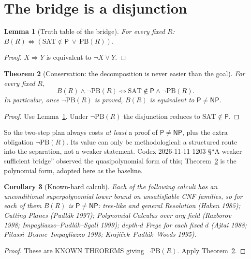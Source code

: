 \documentclass[11pt]{article}
\newtheorem{theorem}{Theorem}
\newtheorem{lemma}[theorem]{Lemma}
\newtheorem{corollary}[theorem]{Corollary}
\theoremstyle{definition}
\newcommand{\Pclass}{\mathsf{P}}
\newcommand{\NP}{\mathsf{NP}}
\newcommand{\SAT}{\mathrm{SAT}}
\newcommand{\PB}{\mathrm{PB}}
\begin{document}
\section{The bridge is a disjunction}
\begin{lemma}[Truth table of the bridge]\label{lem:truth}
For every fixed $R$: $B(R)\iff(\SAT\notin\Pclass\ \vee\ \PB(R))$.
\end{lemma}
\begin{proof}
$X\Rightarrow Y$ is equivalent to $\neg X\vee Y$.
\end{proof}

\begin{theorem}[Conservation: the decomposition is never easier than the goal]\label{thm:conservation}
For every fixed $R$,
\[
B(R)\wedge\neg\PB(R)\iff \SAT\notin\Pclass\wedge\neg\PB(R).
\]
In particular, once $\neg\PB(R)$ is proved, $B(R)$ is equivalent to
$\Pclass\neq\NP$.
\end{theorem}
\begin{proof}
Use Lemma~\ref{lem:truth}. Under $\neg\PB(R)$ the disjunction reduces to
$\SAT\notin\Pclass$.
\end{proof}

So the two-step plan always costs \emph{at least} a proof of
$\Pclass\neq\NP$, plus the extra obligation $\neg\PB(R)$. Its value can only be
methodological: a structured route into the separation, not a weaker statement.
Codex 2026-11-11 1203 §``A weaker sufficient bridge'' observed the
quasipolynomial form of this; Theorem~\ref{thm:conservation} is the polynomial
form, adopted here as the baseline.

\begin{corollary}[Known-hard calculi]\label{cor:known}
Each of the following calculi has an unconditional superpolynomial lower
bound on unsatisfiable CNF families, so for each of them $B(R)$ \emph{is}
$\Pclass\neq\NP$: tree-like and general Resolution (Haken 1985); Cutting
Planes (Pudlák 1997); Polynomial Calculus over any field (Razborov 1998;
Impagliazzo--Pudlák--Sgall 1999); depth-$d$ Frege for each fixed $d$ (Ajtai
1988; Pitassi--Beame--Impagliazzo 1993; Krajíček--Pudlák--Woods 1995).
\end{corollary}
\begin{proof}
These are KNOWN THEOREMS giving $\neg\PB(R)$. Apply Theorem~\ref{thm:conservation}.
\end{proof}
\end{document}
